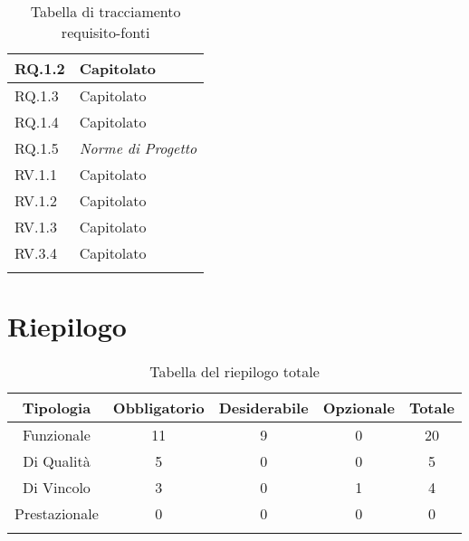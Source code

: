 \begin{center}
\begin{longtable}{|C{6cm}|C{6cm}|}
    RQ.1.2 & Capitolato \\ \hline
    RQ.1.3 & Capitolato \\ \hline
    RQ.1.4 & Capitolato \\ \hline
    RQ.1.5 & \textit{Norme di Progetto} \\ \hline
    RV.1.1 & Capitolato \\ \hline
    RV.1.2 & Capitolato \\ \hline
    RV.1.3 & Capitolato \\ \hline
    RV.3.4 & Capitolato \\ \hline

    \caption{Tabella di tracciamento requisito-fonti}
  \end{longtable}
\end{center}


\section{Riepilogo}

\begin{center}
  \centering
  \begin{longtable}{|c|c|c|c|c|}
    \hline
    \rowcolor[HTML]{036400}
    {\color[HTML]{FFFFFF} \textbf{Tipologia}} & {\color[HTML]{FFFFFF} \textbf{Obbligatorio}} & {\color[HTML]{FFFFFF} \textbf{Desiderabile}} & {\color[HTML]{FFFFFF} \textbf{Opzionale}}  & {\color[HTML]{FFFFFF} \textbf{Totale}} \\ \hline
    \rowcolor[HTML]{EFEFEF}
    Funzionale & 11 & 9 & 0 & 20 \\ \hline
    \rowcolor[HTML]{C0C0C0}
    Di Qualità & 5 & 0 & 0 & 5 \\ \hline
    \rowcolor[HTML]{EFEFEF}
    Di Vincolo & 3 & 0 & 1 & 4 \\ \hline
    \rowcolor[HTML]{C0C0C0}
    Prestazionale & 0 & 0 & 0 & 0 \\ \hline

    \caption{Tabella del riepilogo totale}
  \end{longtable}
\end{center}
